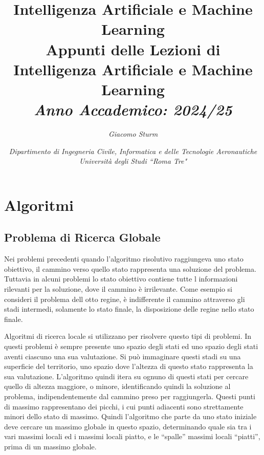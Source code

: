\documentclass{article}
\numberwithin{equation}{subsection}
\begin{document}
\title{%
    \textbf{Intelligenza Artificiale e Machine Learning}  \\ 
    \large Appunti delle Lezioni di Intelligenza Artificiale e Machine Learning \\
    \textit{Anno Accademico: 2024/25}}
\author{\textit{Giacomo Sturm}}
\date{\textit{Dipartimento di Ingegneria Civile, Informatica e delle Tecnologie Aeronautiche \\
Università degli Studi ``Roma Tre"}}

\maketitle
\thispagestyle{link}

\clearpage


\pagestyle{fancy}
\fancyhead{}\fancyfoot{}
\fancyfoot[C]{\thepage}

\tableofcontents

\clearpage
{}



\section{Algoritmi}


\subsection{Problema di Ricerca Globale}

Nei problemi precedenti quando l'algoritmo risolutivo raggiungeva uno stato obiettivo, il cammino verso quello stato rappresenta una soluzione 
del problema. Tuttavia in alcuni problemi lo stato obiettivo contiene tutte l informazioni rilevanti per la soluzione, dove il cammino è 
irrilevante. Come esempio si consideri il problema dell otto regine, è indifferente il cammino attraverso gli stadi intermedi, solamente lo 
stato finale, la disposizione delle regine nello stato finale. 

Algoritmi di ricerca locale si utilizzano per risolvere questo tipi di problemi. In questi problemi è sempre presente uno spazio degli stati 
ed uno spazio degli stati aventi ciascuno una sua valutazione. Si può immaginare questi stadi su una superficie del territorio, uno spazio dove l'altezza 
di questo stato rappresenta la sua valutazione. L'algoritmo quindi itera su ognuno di questi stati per cercare quello di altezza maggiore, o minore, identificando 
quindi la soluzione al problema, indipendentemente dal cammino preso per raggiungerla. Questi punti di massimo rappresentano dei picchi, i cui punti adiacenti sono 
strettamente minori dello stato di massimo. Quindi l'algoritmo che parte da uno stato iniziale deve cercare un massimo globale in questo spazio, determinando quale sia 
tra i vari massimi locali ed i massimi locali piatto, e le ``spalle'' massimi locali ``piatti'', prima di un massimo globale. 
\end{document}
